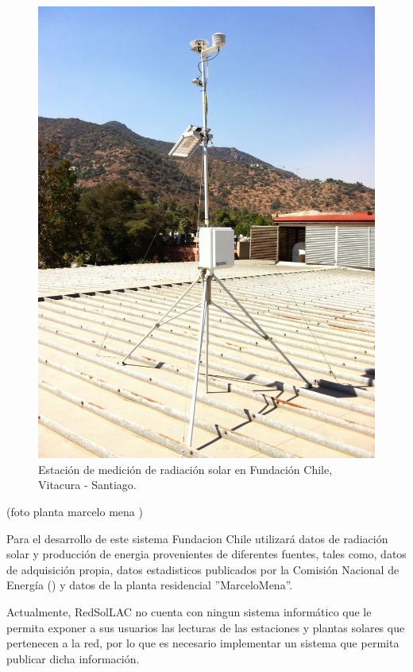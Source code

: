 \begin{figure}[h!]
        \centering
        \includegraphics[scale=0.2]{images/estacionMedicionFch}
        \caption{Estación de medición de radiación solar en Fundación Chile, Vitacura - Santiago.}
	\label{fotoEstacionFch}
\end{figure}

(foto planta marcelo mena )

Para el desarrollo de este sistema Fundacion Chile utilizará datos de radiación solar y producción de energia provenientes de diferentes fuentes, tales como, datos de adquisición propia, datos estadisticos publicados por la Comisión Nacional de Energía () y datos de la planta residencial ''MarceloMena''.

Actualmente, RedSolLAC no cuenta con ningun sistema informático que le permita exponer a sus usuarios las lecturas de las estaciones y plantas solares que pertenecen a la red, por lo que es necesario implementar un sistema que permita publicar dicha información.\\

